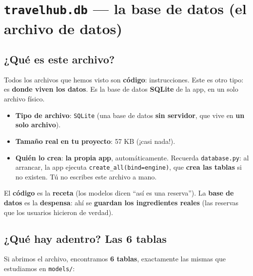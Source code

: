 \documentclass[11pt,a4paper]{article}
\begin{document}
\section{\texttt{travelhub.db} --- la base de datos (el archivo de datos)}

\subsection{¿Qué es este archivo?}

Todos los archivos que hemos visto son \textbf{código}: instrucciones. Este es otro tipo: es
\textbf{donde viven los datos}. Es la base de datos \textbf{SQLite} de la app, en un solo
archivo físico.

\begin{itemize}
    \item \textbf{Tipo de archivo}: \texttt{SQLite} (una base de datos \textbf{sin servidor},
    que vive en \textbf{un solo archivo}).
    \item \textbf{Tamaño real en tu proyecto}: 57 KB (¡casi nada!).
    \item \textbf{Quién lo crea}: \textbf{la propia app}, automáticamente. Recuerda
    \texttt{database.py}: al arrancar, la app ejecuta \texttt{create\_all(bind=engine)}, que
    \textbf{crea las tablas} si no existen. Tú no escribes este archivo a mano.
\end{itemize}

\begin{analogia}
El \textbf{código} es la \textbf{receta} (los modelos dicen ``así es una reserva''). La
\textbf{base de datos} es la \textbf{despensa}: ahí se \textbf{guardan los ingredientes reales}
(las reservas que los usuarios hicieron de verdad).
\end{analogia}

\subsection{¿Qué hay adentro? Las 6 tablas}

Si abrimos el archivo, encontramos \textbf{6 tablas}, exactamente las mismas que estudiamos
en \texttt{models/}:
\end{document}
